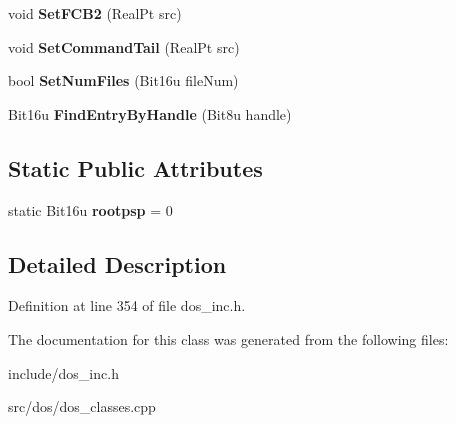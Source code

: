 \begin{DoxyCompactItemize}
\item 
\hypertarget{classDOS__PSP_a4c0066046f23c2d51f36da5f31749299}{void {\bfseries Set\-F\-C\-B2} (Real\-Pt src)}\label{classDOS__PSP_a4c0066046f23c2d51f36da5f31749299}

\item 
\hypertarget{classDOS__PSP_a513c55126b7b22f3fa587f005cbade46}{void {\bfseries Set\-Command\-Tail} (Real\-Pt src)}\label{classDOS__PSP_a513c55126b7b22f3fa587f005cbade46}

\item 
\hypertarget{classDOS__PSP_ac5a10428bbb82e178e67350935882c76}{bool {\bfseries Set\-Num\-Files} (Bit16u file\-Num)}\label{classDOS__PSP_ac5a10428bbb82e178e67350935882c76}

\item 
\hypertarget{classDOS__PSP_a94aa51f3b9eef379d2fbcaf025206a86}{Bit16u {\bfseries Find\-Entry\-By\-Handle} (Bit8u handle)}\label{classDOS__PSP_a94aa51f3b9eef379d2fbcaf025206a86}

\end{DoxyCompactItemize}
\subsection*{Static Public Attributes}
\begin{DoxyCompactItemize}
\item 
\hypertarget{classDOS__PSP_ad46b74f756dae06941329a205ab482fd}{static Bit16u {\bfseries rootpsp} = 0}\label{classDOS__PSP_ad46b74f756dae06941329a205ab482fd}

\end{DoxyCompactItemize}


\subsection{Detailed Description}


Definition at line 354 of file dos\-\_\-inc.\-h.



The documentation for this class was generated from the following files\-:\begin{DoxyCompactItemize}
\item 
include/dos\-\_\-inc.\-h\item 
src/dos/dos\-\_\-classes.\-cpp\end{DoxyCompactItemize}
